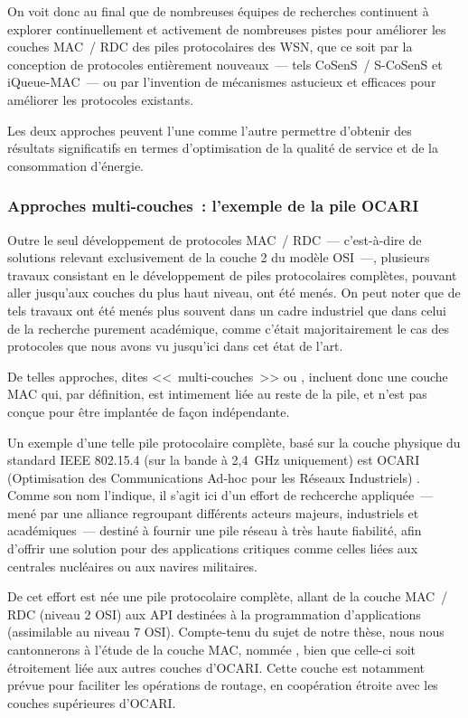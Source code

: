 \bigskip

On voit donc au final que de nombreuses équipes de recherches continuent
à explorer continuellement et activement de nombreuses pistes pour
améliorer les couches MAC~/ RDC des piles protocolaires des WSN,
que ce soit par la conception de protocoles entièrement nouveaux~---
tels CoSenS~/ S-CoSenS et iQueue-MAC~--- ou par l'invention de mécanismes
astucieux et efficaces pour améliorer les protocoles existants.

Les deux approches peuvent l'une comme l'autre permettre d'obtenir
des résultats significatifs en termes d'optimisation de la qualité
de service et de la consommation d'énergie. 

\subsubsection{Approches multi-couches~: l'exemple de la pile OCARI}
\label{ParOCARI}

Outre le seul développement de protocoles MAC~/ RDC~--- c'est-à-dire
de solutions relevant exclusivement de la couche 2 du modèle OSI~---,
plusieurs travaux consistant en le développement de piles protocolaires
complètes, pouvant aller jusqu'aux couches du plus haut niveau, ont été
menés. On peut noter que de tels travaux ont été menés plus souvent dans
un cadre industriel que dans celui de la recherche purement académique,
comme c'était majoritairement le cas des protocoles que nous avons vu
jusqu'ici dans cet état de l'art.

De telles approches, dites <<~multi-couches~>> ou ,
incluent donc une couche MAC qui, par définition, est intimement liée
au reste de la pile, et n'est  pas conçue pour être
implantée de façon indépendante.

Un exemple d'une telle pile protocolaire complète, basé sur la couche
physique du standard IEEE 802.15.4 (sur la bande à 2,4~GHz uniquement)
est OCARI (Optimisation des Communications Ad-hoc pour les Réseaux
Industriels) \cite{OCARI}. Comme son nom l'indique, il s'agit ici d'un
effort de rechcerche appliquée~--- mené par une alliance regroupant
différents acteurs majeurs, industriels et académiques~--- destiné à
fournir une pile réseau à très haute fiabilité, afin d'offrir une
solution pour des applications critiques comme celles liées aux
centrales nucléaires ou aux navires militaires.

De cet effort est née une pile protocolaire complète, allant de la couche
MAC~/ RDC (niveau 2 OSI) aux API destinées à la programmation d'applications
(assimilable au niveau 7 OSI). Compte-tenu du sujet de notre thèse, nous
nous cantonnerons à l'étude de la couche MAC, nommée , bien que
celle-ci soit étroitement liée aux autres couches d'OCARI. Cette couche
est notamment prévue pour faciliter les opérations de routage, en
coopération étroite avec les couches supérieures d'OCARI.

